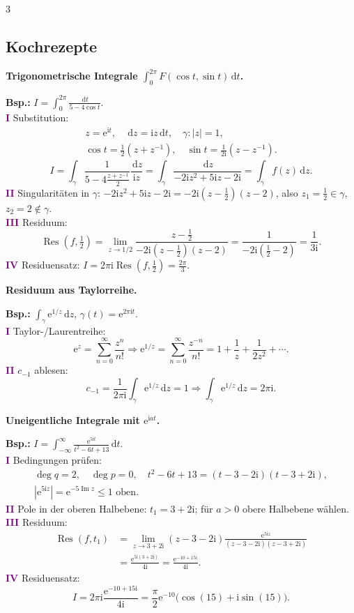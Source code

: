\documentclass[a4paper,landscape]{article}
\newcommand{\dd}{\,\mathrm d}
\newcommand{\ee}{\mathrm e}
\newcommand{\ii}{\mathrm i}
\DeclareMathOperator{\Res}{Res}
\newcommand{\KR}[1]{\textcolor{purple}{\textbf{#1}}}
\newcommand{\themenzeile}[1]{%
  \par\smallskip
  \begingroup
  \setlength{\fboxsep}{0.7mm}%
  \noindent\colorbox{themenrahmen}{%
    \parbox{\dimexpr\linewidth-2\fboxsep\relax}{\color{white}\bfseries #1}}%
  \endgroup
  \par\nobreak\smallskip\nobreak
}
\begin{document}
\begin{multicols*}{3}
\subsection*{Kochrezepte}
\themenzeile{Trigonometrische Integrale $\int_0^{2\pi}F(\cos t,\sin t)\dd t$.}
\textbf{Bsp.:} $I=\int_0^{2\pi}\frac{\dd t}{5-4\cos t}$.\\[-0.2mm]
\KR{I} Substitution:
\[
\begin{gathered}
z=\ee^{\ii t},\quad \dd z=\ii z\dd t,\quad \gamma:|z|=1,\\[-0.5mm]
\cos t=\frac12(z+z^{-1}),\quad \sin t=\frac1{2\ii}(z-z^{-1}).
\end{gathered}
\]
\[
I=\int_\gamma \frac1{5-4\frac{z+z^{-1}}2}\frac{\dd z}{\ii z}
 =\int_\gamma \frac{\dd z}{-2\ii z^2+5\ii z-2\ii}=\int_\gamma f(z)\dd z.
\]
\KR{II} Singularitäten in $\gamma$: $-2\ii z^2+5\ii z-2\ii=-2\ii(z-\frac12)(z-2)$, also $z_1=\frac12\in\gamma$, $z_2=2\notin\gamma$.\\[-0.2mm]
\KR{III} Residuum:
\[
\Res(f,\tfrac12)=\lim_{z\to1/2}\frac{z-\frac12}{-2\ii(z-\frac12)(z-2)}=\frac1{-2\ii(\frac12-2)}=\frac1{3\ii}.
\]
\KR{IV} Residuensatz: $I=2\pi\ii\Res(f,\frac12)=\frac{2\pi}{3}$.\\[0.5mm]

\themenzeile{Residuum aus Taylorreihe.}
\textbf{Bsp.:} $\int_\gamma \ee^{1/z}\dd z$, $\gamma(t)=\ee^{2\pi\ii t}$.\\[-0.2mm]
\KR{I} Taylor-/Laurentreihe:
\[
\ee^z=\sum_{n=0}^\infty\frac{z^n}{n!}\Rightarrow
\ee^{1/z}=\sum_{n=0}^\infty\frac{z^{-n}}{n!}=1+\frac1z+\frac1{2z^2}+\cdots .
\]
\KR{II} $c_{-1}$ ablesen:
\[
c_{-1}=\frac1{2\pi\ii}\int_\gamma \ee^{1/z}\dd z=1
\Rightarrow \int_\gamma \ee^{1/z}\dd z=2\pi\ii.
\]

\themenzeile{Uneigentliche Integrale mit $\ee^{\ii at}$.}
\textbf{Bsp.:} $I=\int_{-\infty}^{\infty}\frac{\ee^{5\ii t}}{t^2-6t+13}\dd t$.\\[-0.2mm]
\KR{I} Bedingungen prüfen:
\[
\begin{gathered}
\deg q=2,\quad \deg p=0,\quad
t^2-6t+13=(t-3-2\ii)(t-3+2\ii),\\
|\ee^{5\ii z}|=\ee^{-5\operatorname{Im}z}\le1\text{ oben}.
\end{gathered}
\]
\KR{II} Pole in der oberen Halbebene: $t_1=3+2\ii$; für $a>0$ obere Halbebene wählen.\\[-0.2mm]
\KR{III} Residuum:
\[
\begin{aligned}
\Res(f,t_1)
&=\lim_{z\to3+2\ii}(z-3-2\ii)
\frac{\ee^{5\ii z}}{(z-3-2\ii)(z-3+2\ii)}\\
&=\frac{\ee^{5\ii(3+2\ii)}}{4\ii}
=\frac{\ee^{-10+15\ii}}{4\ii}.
\end{aligned}
\]
\KR{IV} Residuensatz:
\[
I=2\pi\ii\frac{\ee^{-10+15\ii}}{4\ii}
=\frac\pi2\ee^{-10}\bigl(\cos(15)+\ii\sin(15)\bigr).
\]


\end{multicols*}
\end{document}
